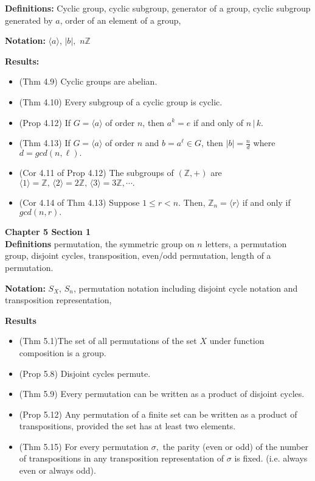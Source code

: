 \documentclass[12pt]{article}
\newcommand{\bbZ}{\mathbb{Z}}
\newcommand{\divs}{\, \big | \,}
\begin{document}
\textbf{Definitions:} Cyclic group, cyclic subgroup, generator of a group, cyclic subgroup generated by $a$, order of an element of a group,

\textbf{Notation:} $\langle a \rangle$, $|b|,$ $n \bbZ$

\textbf{Results:}
\begin{itemize}
	\item (Thm 4.9) Cyclic groups are abelian.
	\item (Thm 4.10) Every subgroup of a cyclic group is cyclic.
	\item (Prop 4.12) If $G=\langle a \rangle$ of order $n$, then $a^k=e$ if and only of $n \divs k.$
	\item (Thm 4.13)  If $G=\langle a \rangle$ of order $n$ and $b=a^\ell \in G$, then $|b|=\frac{n}{d}$ where $d=gcd(n,\ell).$
	\item (Cor 4.11 of Prop 4.12) The subgroups of $(\bbZ,+)$ are $\langle 1 \rangle=\bbZ, \, \langle 2 \rangle=2\bbZ, \, \langle 3 \rangle=3\bbZ, \cdots.$
	\item  (Cor 4.14 of Thm 4.13) Suppose $1 \leq r < n.$ Then,
	$\bbZ_n=\langle r \rangle$ if and only if $gcd(n,r).$
\end{itemize}



\noindent \textbf{Chapter 5 Section 1}\\

\textbf{Definitions} permutation, the symmetric group on $n$ letters, a permutation group, disjoint cycles, transposition, even/odd permutation, length of a permutation.

\textbf{Notation:} $S_X$, $S_n$, permutation notation including disjoint cycle notation and transposition representation,

\textbf{Results}
\begin{itemize}
	\item (Thm 5.1)The set of all permutations of the set $X$ under function composition is a group.
	\item (Prop 5.8) Disjoint cycles permute.
	\item (Thm 5.9) Every permutation can be written as a product of disjoint cycles.
	\item (Prop 5.12) Any permutation of a finite set can be written as a product of transpositions, provided the set has at least two elements.
	\item (Thm 5.15) For every permutation $\sigma,$ the parity (even or odd) of the number of transpositions in any transposition representation of $\sigma$ is fixed. (i.e. always even or always odd).
\end{itemize}
\end{document}
